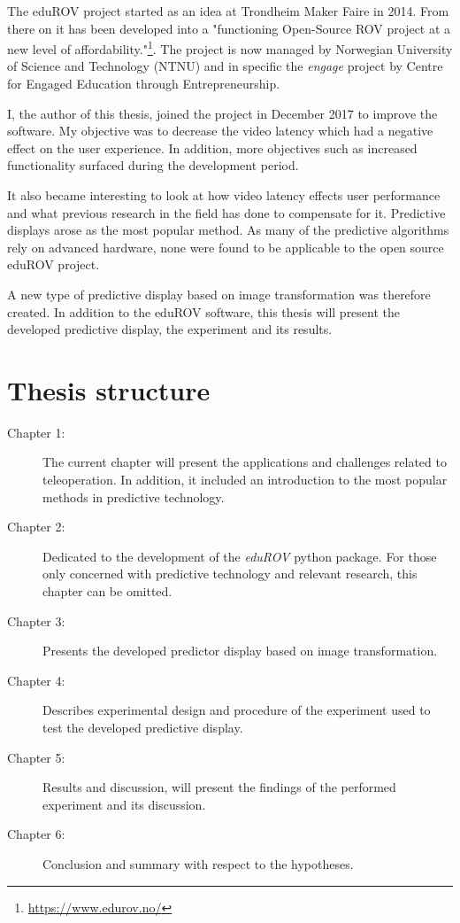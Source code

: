 The eduROV project started as an idea at Trondheim Maker Faire in 2014. From there on it has been developed into a "functioning Open-Source ROV project at a new level of affordability."\footnote{\url{https://www.edurov.no/}}. The project is now managed by Norwegian University of Science and Technology (NTNU) and in specific the \emph{engage} project by Centre for Engaged Education through Entrepreneurship. 

I, the author of this thesis, joined the project in December 2017 to improve the software. My objective was to decrease the video latency which had a negative effect on the user experience. In addition, more objectives such as increased functionality surfaced during the development period.

It also became interesting to look at how video latency effects user performance and what previous research in the field has done to compensate for it. Predictive displays arose as the most popular method. As many of the predictive algorithms rely on advanced hardware, none were found to be applicable to the open source eduROV project.

A new type of predictive display based on image transformation was therefore created. In addition to the eduROV software, this thesis will present the developed predictive display, the experiment and its results.

\section{Thesis structure}

\begin{description}
\item [Chapter 1:] The current chapter will present the applications and challenges related to teleoperation. In addition, it included an introduction to the most popular methods in predictive technology.

\item [Chapter 2:] Dedicated to the development of the \textit{eduROV} python package. For those only concerned with predictive technology and relevant research, this chapter can be omitted.

\item [Chapter 3:] Presents the developed predictor display based on image transformation.

\item [Chapter 4:] Describes experimental design and procedure of the experiment used to test the developed predictive display.

\item [Chapter 5:] Results and discussion, will present the findings of the performed experiment and its discussion.

\item [Chapter 6:] Conclusion and summary with respect to the hypotheses.
\end{description}


